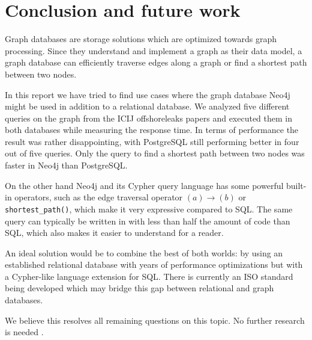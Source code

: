 \documentclass[11pt, a4paper,oneside,chapterprefix=false]{scrbook}
\begin{document}
\chapter{Conclusion and future work} \label{chp:conclusion}

Graph databases are storage solutions which are optimized towards graph processing.
Since they understand and implement a graph as their data model, a graph database can efficiently traverse edges along a graph or find a shortest path between two nodes.

In this report we have tried to find use cases where the graph database Neo4j might be used in addition to a relational database.
We analyzed five different queries on the graph from the ICIJ offshoreleaks papers and executed them in both databases while measuring the response time.
In terms of performance the result was rather disappointing, with PostgreSQL still performing better in four out of five queries.
Only the query to find a shortest path between two nodes was faster in Neo4j than PostgreSQL.

On the other hand Neo4j and its Cypher query language has some powerful built-in operators, such as the edge traversal operator $(a) \rightarrow (b)$ or \lstinline{shortest_path()}, which make it very expressive compared to SQL.
The same query can typically be written in with less than half the amount of code than SQL, which also makes it easier to understand for a reader.

An ideal solution would be to combine the best of both worlds: by using an established relational database with years of performance optimizations but with a Cypher-like language extension for SQL.
There is currently an ISO standard being developed \cite{sqlpgd} which may bridge this gap between relational and graph databases.

We believe this resolves all remaining questions on this topic. No further research is needed \cite{xkcdresearch}.



\end{document}
